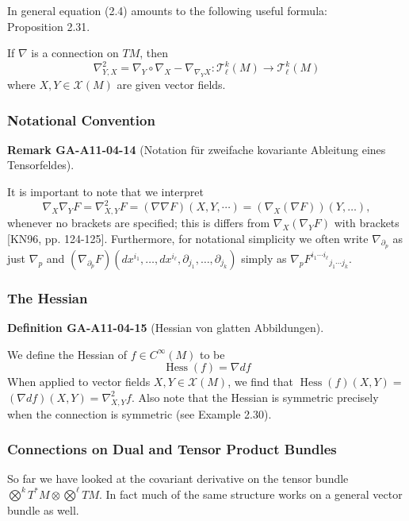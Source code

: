 \documentclass[10pt, letterpaper]{article}
\newcommand{\CustomHeading}[3]{%
  \par\medskip\noindent%
  \textbf{#1 #2} \textnormal{(#3)}.\enskip%
}
\newenvironment{DEF}[2]{\begin{unitbox}\CustomHeading{Definition}{#1}{#2}}{\end{unitbox}}
\newenvironment{REM}[2]{\begin{unitbox}\CustomHeading{Remark}{#1}{#2}}{\end{unitbox}}
\begin{document}
In general equation (2.4) amounts to the following useful formula:\\


Proposition 2.31. 

If $\nabla$ is a connection on $T M$, then
$$
\nabla_{Y, X}^{2}=\nabla_{Y} \circ \nabla_{X}-\nabla_{\nabla_{Y} X}: \mathscr{T}_{\ell}^{k}(M) \rightarrow \mathscr{T}_{\ell}^{k}(M)
$$
where $X, Y \in \mathscr{X}(M)$ are given vector fields.


\subsubsection*{Notational Convention}

\begin{REM}{GA-A11-04-14}{Notation für zweifache kovariante Ableitung eines Tensorfeldes}
It is important to note that we interpret
$$
\nabla_{X} \nabla_{Y} F=\nabla_{X, Y}^{2} F=(\nabla \nabla F)(X, Y, \cdots)=\left(\nabla_{X}(\nabla F)\right)(Y, \ldots),
$$
whenever no brackets are specified; this is differs from $\nabla_{X}\left(\nabla_{Y} F\right)$ with brackets [KN96, pp. 124-125]. Furthermore, for notational simplicity we often write $\nabla_{\partial_{p}}$ as just $\nabla_{p}$ and $\left(\nabla_{\partial_{p}} F\right)\left(d x^{i_{1}}, \ldots, d x^{i_{\ell}}, \partial_{j_{1}}, \ldots, \partial_{j_{k}}\right)$ simply as $\nabla_{p} F^{i_{1} \cdots i_{\ell}}{ }_{j_{1} \cdots j_{k}}$.
\end{REM}



\subsubsection*{The Hessian}


\begin{DEF}{GA-A11-04-15}{Hessian von glatten Abbildungen}
We define the Hessian of $f \in C^{\infty}(M)$ to be
$$
\operatorname{Hess}(f)=\nabla d f
$$
When applied to vector fields $X, Y \in \mathscr{X}(M)$, we find that $\operatorname{Hess}(f)(X, Y)=$ $(\nabla d f)(X, Y)=\nabla_{X, Y}^{2} f$. Also note that the Hessian is symmetric precisely when the connection is symmetric (see Example 2.30).
\end{DEF}





\subsubsection*{Connections on Dual and Tensor Product Bundles}
So far we have looked at the covariant derivative on the tensor bundle $\bigotimes^{k} T^{*} M \otimes \bigotimes^{\ell} T M$. In fact much of the same structure works on a general vector bundle as well.
\end{document}

